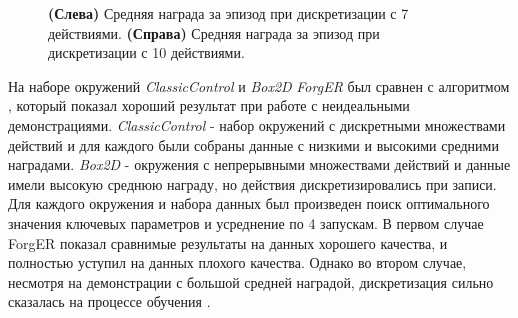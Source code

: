\documentclass{mipt-thesis-bs}
\begin{document}
\begin{figure}[ht]
    \centering
    \hspace{0.08\linewidth}
    \vspace{-0.2cm}
    \caption{ \textbf{(Слева)} Средняя награда за эпизод при дискретизации с 7 действиями.
    \textbf{(Справа)} Средняя награда за эпизод при дискретизации с 10 действиями.
    \label{treechop}
    }
\end{figure}

На наборе окружений \textit{ClassicControl} и \textit{Box2D} \textit{ForgER} был сравнен с алгоритмом \cite{pofd}, который показал хороший результат при работе с неидеальными демонстрациями. \textit{ClassicControl} - набор окружений с дискретными множествами действий и для каждого были собраны данные с низкими и высокими средними наградами. \textit{Box2D} - окружения с непрерывными множествами действий и данные имели высокую среднюю награду, но действия дискретизировались при записи. Для каждого окружения и набора данных был произведен поиск оптимального значения ключевых параметров и усреднение по 4 запускам. В первом случае ForgER показал сравнимые результаты на данных хорошего качества, и полностью уступил на данных плохого качества. Однако во втором случае, несмотря на демонстрации с большой средней наградой, дискретизация сильно сказалась на процессе обучения \cite{pofd}.  
\end{document}
